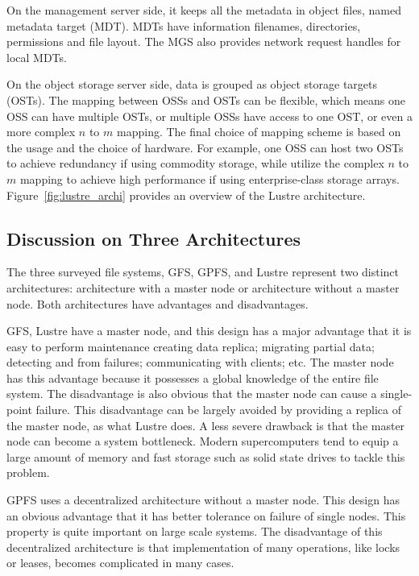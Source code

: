 On the management server side, it keeps all the metadata in object files,
named metadata target (MDT).
%
MDTs have information filenames, directories, permissions and file layout.
%
The MGS also provides network request handles for local MDTs.

On the object storage server side, data is grouped as object storage targets
(OSTs). 
%
The mapping between OSSs and OSTs can be flexible, which means 
one OSS can have multiple OSTs, or
multiple OSSs have access to one OST, or
even a more complex $n$ to $m$ mapping.
%
The final choice of mapping scheme is based on the usage and the choice of 
hardware. 
%
For example, one OSS can host two OSTs to achieve redundancy if using 
commodity storage, while utilize the complex $n$ to $m$ mapping to achieve
high performance if using enterprise-class storage arrays.
%
Figure~\ref{fig:lustre_archi} provides an overview of the Lustre architecture.


\subsection{Discussion on Three Architectures}
The three surveyed file systems, GFS, GPFS, and Lustre represent two 
distinct architectures: architecture with a master node or 
architecture without a master node.
%
Both architectures have advantages and disadvantages.

GFS, Lustre have a master node, and this design has a major advantage
that it is easy to perform maintenance creating data replica; 
migrating partial data; detecting and 
from failures; communicating with clients; etc.
%
The master node has this advantage because it possesses a global knowledge
of the entire file system.
%
The disadvantage is also obvious that the master node can cause a 
single-point failure.
%
This disadvantage can be largely avoided by providing a replica of the master
node, as what Lustre does.
%
A less severe drawback is that the master node can become a system bottleneck.
%
Modern supercomputers tend to equip a large amount of memory and fast storage
such as solid state drives to tackle this problem.

GPFS uses a decentralized architecture without a master node.
%
This design has an obvious advantage that it has better tolerance on 
failure of single nodes.
%
This property is quite important on large scale systems.
%
The disadvantage of this decentralized architecture is that implementation
of many operations, like locks or leases, becomes complicated in many cases.
%




